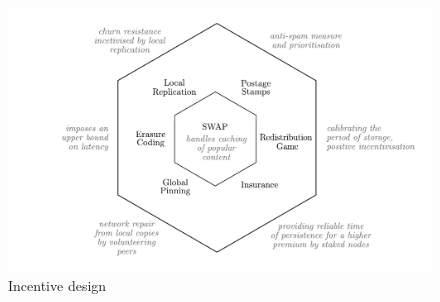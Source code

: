\begin{figure}[htbp]
\centering
\includegraphics[width=\textwidth]{fig/incentive-design-3.pdf}
\caption[Incentive design \statusgreen]{Incentive design}
\label{fig:incentives}
\end{figure}




